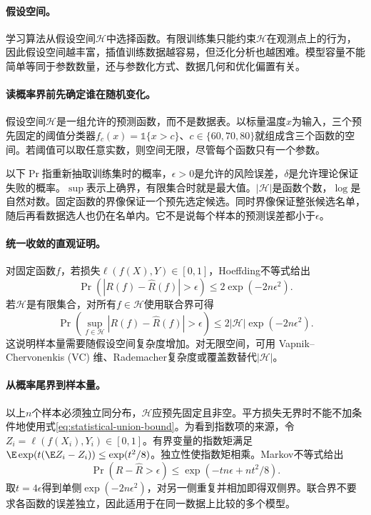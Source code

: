 \paragraph{假设空间。}
学习算法从假设空间$\mathcal{H}$中选择函数。有限训练集只能约束$\mathcal{H}$在观测点上的行为，因此假设空间越丰富，插值训练数据越容易，但泛化分析也越困难。模型容量不能简单等同于参数数量，还与参数化方式、数据几何和优化偏置有关。

\paragraph{读概率界前先确定谁在随机变化。}
假设空间$\mathcal H$是一组允许的预测函数，而不是数据表。以标量温度$x$为输入，三个预先固定的阈值分类器$f_c(x)=\mathbb 1\{x>c\}$、$c\in\{60,70,80\}$就组成含三个函数的空间。若阈值可以取任意实数，则空间无限，尽管每个函数只有一个参数。

以下$\Pr$指重新抽取训练集时的概率，$\epsilon>0$是允许的风险误差，$\delta$是允许理论保证失败的概率。$\sup$表示上确界，有限集合时就是最大值。$|\mathcal H|$是函数个数，$\log$是自然对数。固定函数的界像保证一个预先选定候选。同时界像保证整张候选名单，随后再看数据选人也仍在名单内。它不是说每个样本的预测误差都小于$\epsilon$。

\paragraph{统一收敛的直观证明。}
对固定函数$f$，若损失$\ell(f(X),Y)\in[0,1]$，Hoeffding不等式给出
\begin{equation}
 \Pr\left(|R(f)-\hat R(f)|>\epsilon\right)\leq2\exp(-2n\epsilon^2).
\end{equation}
若$\mathcal{H}$是有限集合，对所有$f\in\mathcal{H}$使用联合界可得
\begin{equation}
 \Pr\left(\sup_{f\in\mathcal{H}}|R(f)-\hat R(f)|>\epsilon\right)
 \leq2|\mathcal{H}|\exp(-2n\epsilon^2).\label{eq:statistical-union-bound}
\end{equation}
这说明样本量需要随假设空间复杂度增加。对无限空间，可用 Vapnik--Chervonenkis (VC) 维、Rademacher复杂度或覆盖数替代$|\mathcal{H}|$。

\paragraph{从概率尾界到样本量。}
以上$n$个样本必须独立同分布，$\mathcal H$应预先固定且非空。平方损失无界时不能不加条件地使用式\eqref{eq:statistical-union-bound}。为看到指数项的来源，令$Z_i=\ell(f(X_i),Y_i)\in[0,1]$。有界变量的指数矩满足$\E\exp(t(\E Z_i-Z_i))\leq\exp(t^2/8)$。独立性使指数矩相乘。Markov不等式给出
\begin{equation}
 \Pr(R-\hat R>\epsilon)
 \leq\exp(-tn\epsilon+nt^2/8).
\end{equation}
取$t=4\epsilon$得到单侧$\exp(-2n\epsilon^2)$，对另一侧重复并相加即得双侧界。联合界不要求各函数的误差独立，因此适用于在同一数据上比较的多个模型。

